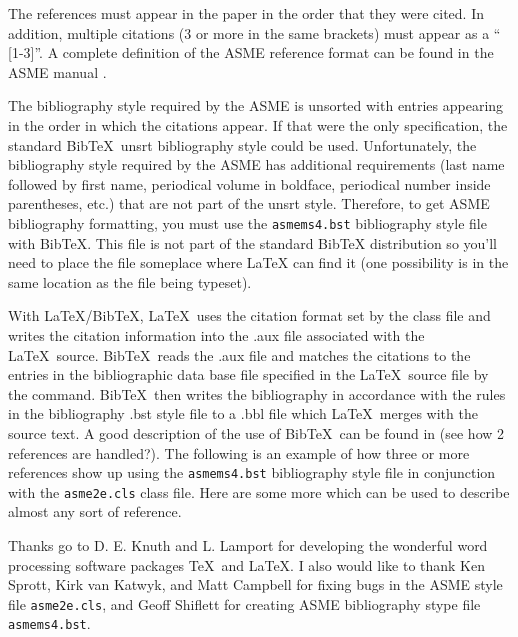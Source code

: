 \documentclass[twocolumn,10pt]{asme2e}
\begin{document}
The references must appear in the paper in the order that they were cited.  In addition, multiple citations (3 or more in the same brackets) must appear as a `` [1-3]''.  A complete definition of the ASME reference format can be found in the  ASME manual \cite{asmemanual}.

The bibliography style required by the ASME is unsorted with entries appearing in the order in which the citations appear. If that were the only specification, the standard {\sc Bib}\TeX\ unsrt bibliography style could be used. Unfortunately, the bibliography style required by the ASME has additional requirements (last name followed by first name, periodical volume in boldface, periodical number inside parentheses, etc.) that are not part of the unsrt style. Therefore, to get ASME bibliography formatting, you must use the \verb+asmems4.bst+ bibliography style file with {\sc Bib}\TeX. This file is not part of the standard BibTeX distribution so you'll need to place the file someplace where LaTeX can find it (one possibility is in the same location as the file being typeset).

With \LaTeX/{\sc Bib}\TeX, \LaTeX\ uses the citation format set by the class file and writes the citation information into the .aux file associated with the \LaTeX\ source. {\sc Bib}\TeX\ reads the .aux file and matches the citations to the entries in the bibliographic data base file specified in the \LaTeX\ source file by the \verb++ command. {\sc Bib}\TeX\ then writes the bibliography in accordance with the rules in the bibliography .bst style file to a .bbl file which \LaTeX\ merges with the source text.  A good description of the use of {\sc Bib}\TeX\ can be found in \cite{latex, goosens} (see how 2 references are handled?).  The following is an example of how three or more references \cite{latex, asmemanual,  goosens} show up using the \verb+asmems4.bst+ bibliography style file in conjunction with the \verb+asme2e.cls+ class file. Here are some more \cite{art, blt, ibk, icn, ips, mts, mis, pro, pts, trt, upd} which can be used to describe almost any sort of reference.




\begin{acknowledgment}
Thanks go to D. E. Knuth and L. Lamport for developing the wonderful word processing software packages \TeX\ and \LaTeX. I also would like to thank Ken Sprott, Kirk van Katwyk, and Matt Campbell for fixing bugs in the ASME style file \verb+asme2e.cls+, and Geoff Shiflett for creating 
ASME bibliography stype file \verb+asmems4.bst+.
\end{acknowledgment}
\end{document}
